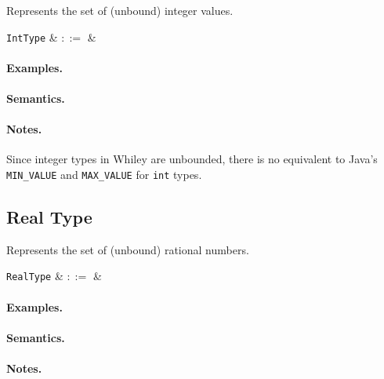 Represents the set of (unbound) integer values. 

\begin{syntax}
  \verb+IntType+ & $::=$ &  \\
\end{syntax}

\paragraph{Examples.}

\paragraph{Semantics.}

\paragraph{Notes.}  Since integer types in Whiley are unbounded, there
is no equivalent to Java's \lstinline{MIN_VALUE} and \lstinline{MAX_VALUE} for \lstinline{int} types.


\subsection{Real Type}

Represents the set of (unbound) rational numbers.

\begin{syntax}
  \verb+RealType+ & $::=$ &  \\
\end{syntax}

\paragraph{Examples.}

\paragraph{Semantics.}

\paragraph{Notes.} 


